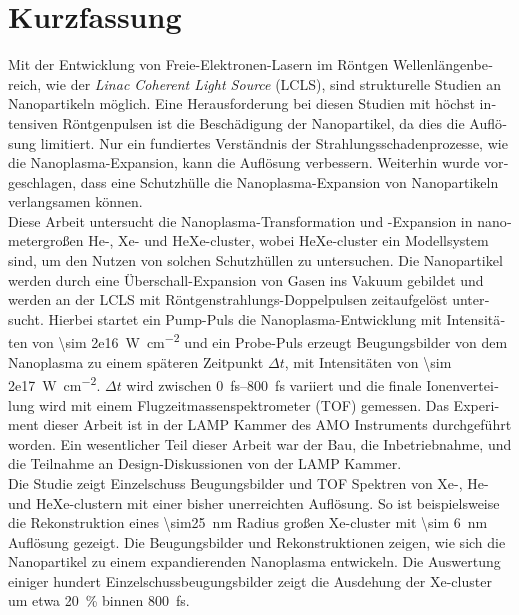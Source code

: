 \section*{Kurzfassung}
\begin{otherlanguage}{german}
Mit der Entwicklung von Freie-Elektronen-Lasern im Röntgen Wellenlängenbereich, wie der \textit{Linac Coherent Light Source} (LCLS), sind strukturelle Studien an Nanopartikeln möglich. Eine Herausforderung bei diesen Studien mit höchst intensiven Röntgenpulsen ist die Beschädigung der Nanopartikel, da dies die Auflösung limitiert. Nur ein fundiertes Verständnis der Strahlungsschadenprozesse, wie die Nanoplasma-Expansion, kann die Auflösung verbessern. Weiterhin wurde vorgeschlagen, dass eine Schutzhülle die Nanoplasma-Expansion von Nanopartikeln verlangsamen können.\\[0.6\baselineskip]
%
Diese Arbeit untersucht die Nanoplasma-Transformation und -Expansion in nanometergroßen He-, Xe- und HeXe-cluster, wobei HeXe-cluster ein Modellsystem sind, um den Nutzen von solchen Schutzhüllen zu untersuchen. Die Nanopartikel werden durch eine Überschall-Expansion von Gasen ins Vakuum gebildet und werden an der LCLS mit Röntgenstrahlungs-Doppelpulsen zeitaufgelöst untersucht. Hierbei startet ein Pump-Puls die Nanoplasma-Entwicklung mit Intensitäten von \SI{\sim 2e16}{\watt\per\square\centi\meter} und ein Probe-Puls erzeugt Beugungsbilder von dem Nanoplasma zu einem späteren Zeitpunkt $\Delta t$, mit Intensitäten von \SI{\sim 2e17}{\watt\per\square\centi\meter}. $\Delta t$ wird zwischen \SIrange{0}{800}{\femto\second} variiert und die finale Ionenverteilung wird mit einem Flugzeitmassenspektrometer (TOF) gemessen. Das Experiment dieser Arbeit ist in der LAMP Kammer des AMO Instruments durchgeführt worden. Ein wesentlicher Teil dieser Arbeit war der Bau, die Inbetriebnahme, und die Teilnahme an Design-Diskussionen von der LAMP Kammer.\\[0.6\baselineskip]
%
Die Studie zeigt Einzelschuss Beugungsbilder und TOF Spektren von Xe-, He- und HeXe-clustern mit einer bisher unerreichten Auflösung. So ist beispielsweise die Rekonstruktion eines \SI{\sim25}{\nano\meter} Radius großen Xe-cluster mit \SI{\sim 6}{\nano\meter} Auflösung gezeigt. Die Beugungsbilder und Rekonstruktionen zeigen, wie sich die Nanopartikel zu einem expandierenden Nanoplasma entwickeln. Die Auswertung einiger hundert Einzelschussbeugungsbilder zeigt die Ausdehung der Xe-cluster um etwa \SI{20}{\percent} binnen \SI{800}{\femto\second}. 

\end{otherlanguage}
